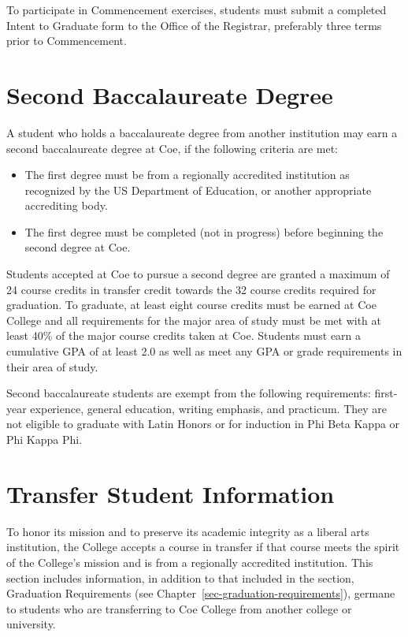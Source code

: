 \documentclass[
  letterpaper,
]{scrbook}
\providecommand{\tightlist}{%
  \setlength{\itemsep}{0pt}\setlength{\parskip}{0pt}}
\begin{document}
To participate in Commencement exercises, students must submit a
completed Intent to Graduate form to the Office of the Registrar,
preferably three terms prior to Commencement.

\section{Second Baccalaureate
Degree}\label{sec-second-baccalaureate-degree}

A student who holds a baccalaureate degree from another institution may
earn a second baccalaureate degree at Coe, if the following criteria are
met:

\begin{itemize}
\tightlist
\item
  The first degree must be from a regionally accredited institution as
  recognized by the US Department of Education, or another appropriate
  accrediting body.
\item
  The first degree must be completed (not in progress) before beginning
  the second degree at Coe.
\end{itemize}

Students accepted at Coe to pursue a second degree are granted a maximum
of 24 course credits in transfer credit towards the 32 course credits
required for graduation. To graduate, at least eight course credits must
be earned at Coe College and all requirements for the major area of
study must be met with at least 40\% of the major course credits taken
at Coe. Students must earn a cumulative GPA of at least 2.0 as well as
meet any GPA or grade requirements in their area of study.

Second baccalaureate students are exempt from the following
requirements: first-year experience, general education, writing
emphasis, and practicum. They are not eligible to graduate with Latin
Honors or for induction in Phi Beta Kappa or Phi Kappa Phi.

\section{Transfer Student
Information}\label{transfer-student-information}

To honor its mission and to preserve its academic integrity as a liberal
arts institution, the College accepts a course in transfer if that
course meets the spirit of the College's mission and is from a
regionally accredited institution. This section includes information, in
addition to that included in the section, Graduation Requirements (see
Chapter~\ref{sec-graduation-requirements}), germane to students who are
transferring to Coe College from another college or university.
\end{document}
